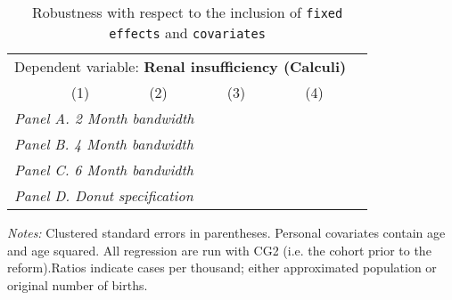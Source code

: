  \begin{table}[H] \begin{threeparttable} \centering \caption{Robustness with respect to the inclusion of \texttt{fixed effects} and \texttt{covariates}} {\def\sym#1{\ifmmode^{#1}\else\(^{#1}\)\fi} \begin{tabular}{l*{5}{c}} \toprule \multicolumn{5}{c}{Dependent variable: \textbf{Renal insufficiency (Calculi)}} \\ \cmidrule(lr){2-5}
            &\multicolumn{1}{c}{(1)}&\multicolumn{1}{c}{(2)}&\multicolumn{1}{c}{(3)}&\multicolumn{1}{c}{(4)}\\
\midrule
 \multicolumn{5}{l}{\emph{Panel A. 2 Month bandwidth}} \\    \midrule\multicolumn{5}{l}{\emph{Panel B. 4 Month bandwidth}} \\    \midrule\multicolumn{5}{l}{\emph{Panel C. 6 Month bandwidth}} \\    \midrule\multicolumn{5}{l}{\emph{Panel D. Donut specification}} \\    \midrule  
\bottomrule \end{tabular} } \begin{tablenotes} \item \scriptsize \emph{Notes:} Clustered standard errors in parentheses. Personal covariates contain age and age squared. All regression are run with CG2 (i.e. the cohort prior to the reform).Ratios indicate cases per thousand; either approximated population or original number of births. \end{tablenotes} \end{threeparttable} \end{table} 
